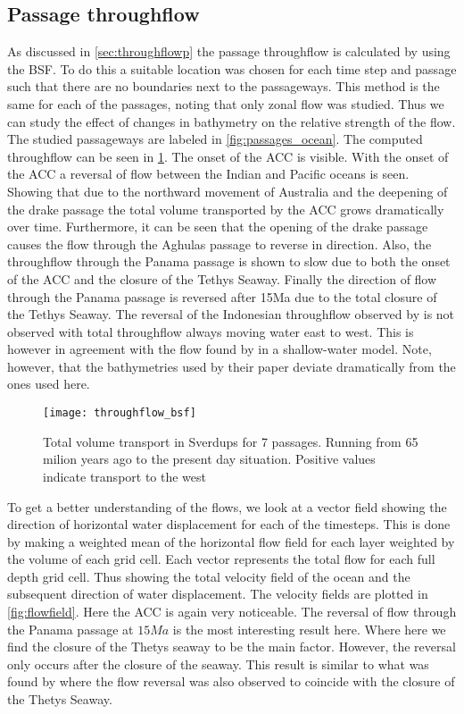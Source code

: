 \subsection{Passage throughflow} \label{sec:throughflow}
As discussed in \cref{sec:throughflowp} the passage throughflow is calculated by using the BSF. To do this a suitable location was chosen for each time step and passage such that there are no boundaries next to the passageways. This method is the same for each of the passages, noting that only zonal flow was studied. Thus we can study the effect of changes in bathymetry on the relative strength of the flow.  The studied passageways are labeled in \cref{fig:passages_ocean}. The computed throughflow can be seen in \cref{fig:throughflow}. The onset of the ACC is visible. With the onset of the ACC a reversal of flow between the Indian and Pacific oceans is seen. Showing that due to the northward movement of Australia and the deepening of the drake passage the total volume transported by the ACC grows dramatically over time. Furthermore, it can be seen that the opening of the drake passage causes the flow through the Aghulas passage to reverse in direction. Also, the throughflow through the Panama passage is shown to slow due to both the onset of the ACC and the closure of the Tethys Seaway. Finally the direction of flow through the Panama passage is reversed after 15Ma due to the total closure of the Tethys Seaway. The reversal of the Indonesian throughflow observed by \cite{Mulder2017Jul} is not observed with total throughflow always moving water east to west. This is however in agreement with the flow found by \cite{omta2003physical} in a shallow-water model. Note, however, that the bathymetries used by their paper deviate dramatically from the ones used here.

\begin{figure}[H]
	\texttt{[image: throughflow\_bsf]}
	\caption{Total volume transport in Sverdups for 7 passages. Running from 65 milion years ago to the present day situation. Positive values indicate transport to the west}
	\label{fig:throughflow}
\end{figure}

To get a better understanding of the flows, we look at a vector field showing the direction of horizontal water displacement for each of the timesteps. This is done by making a weighted mean of the horizontal flow field for each layer weighted by the volume of each grid cell. Each vector represents the total flow for each full depth grid cell. Thus showing the total velocity field of the ocean and the subsequent direction of water displacement. The velocity fields are plotted in  \cref{fig:flowfield}. Here the ACC is again very noticeable. The reversal of flow through the Panama passage at $15Ma$ is the most interesting result here.  Where here we find the closure of the Thetys seaway to be the main factor. However, the reversal only occurs after the closure of the seaway. This result is similar to what was found by \cite{omta2003physical} where the flow reversal was also observed to coincide with the closure of the Thetys Seaway.

